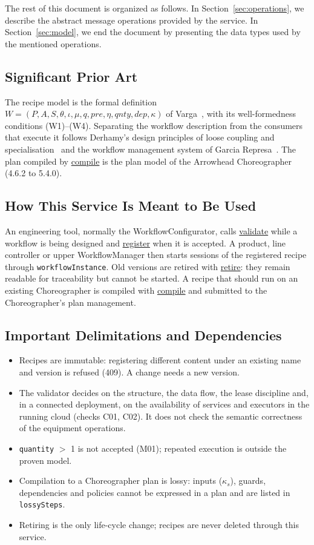 \documentclass[a4paper]{arrowhead}
\newcommand{\oref}[1]{{\textcolor{ArrowheadBlue}{\hyperref[sec:operations:#1]{#1}}}}
\begin{document}
The rest of this document is organized as follows.
In Section~\ref{sec:operations}, we describe the abstract message operations provided by the service.
In Section~\ref{sec:model}, we end the document by presenting the data types used by the mentioned operations.

\subsection{Significant Prior Art}
The recipe model is the formal definition $W = (P, A, S, \theta, \iota, \mu, q, pre, \eta, qnty, dep, \kappa)$
of Varga~\cite{varga2026}, with its well-formedness conditions (W1)--(W4). Separating the workflow description from the
consumers that execute it follows Derhamy's design principles of loose coupling and specialisation~\cite{derhamy2018}
and the workflow management system of Garcia Represa~\cite{represa2022}. The plan compiled by \oref{compile} is the
plan model of the Arrowhead Choreographer (4.6.2 to 5.4.0).

\subsection{How This Service Is Meant to Be Used}
An engineering tool, normally the WorkflowConfigurator, calls \oref{validate} while a workflow is being
designed and \oref{register} when it is accepted. A product, line controller or upper WorkflowManager then starts
sessions of the registered recipe through \texttt{workflow\allowbreak{}Instance}. Old versions are retired with \oref{retire}: they
remain readable for traceability but cannot be started. A recipe that should run on an existing Choreographer is
compiled with \oref{compile} and submitted to the Choreographer's plan management.

\subsection{Important Delimitations and Dependencies}
\label{sec:delimitations}
\begin{itemize}
\item Recipes are immutable: registering different content under an existing name and version is refused (409). A change needs a new version.
\item The validator decides on the structure, the data flow, the lease discipline and, in a connected deployment, on the availability of services and executors in the running cloud (checks C01, C02). It does not check the semantic correctness of the equipment operations.
\item \texttt{quantity} $>$ 1 is not accepted (M01); repeated execution is outside the proven model.
\item Compilation to a Choreographer plan is lossy: inputs ($\kappa_s$), guards, dependencies and policies cannot be expressed in a plan and are listed in \texttt{lossySteps}.
\item Retiring is the only life-cycle change; recipes are never deleted through this service.
\end{itemize}
\end{document}
